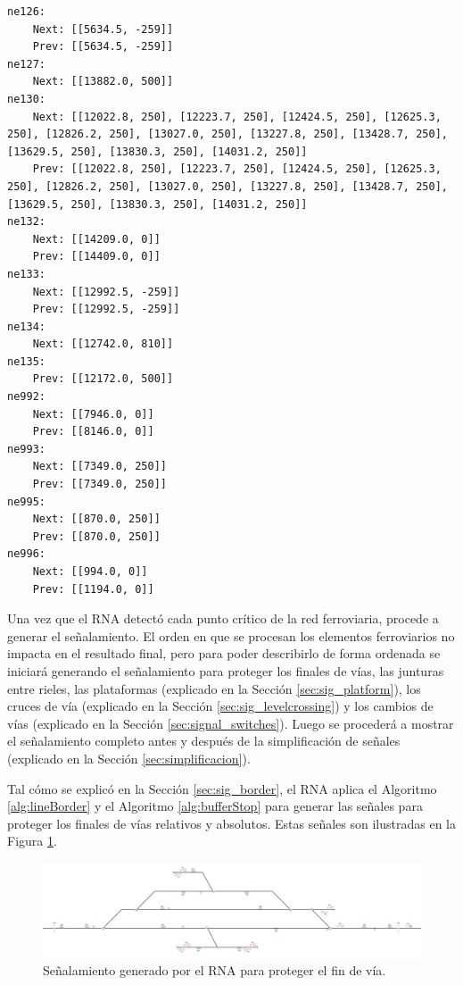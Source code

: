 \begin{lstlisting}[language = {}, tabsize=4, basicstyle=\footnotesize\ttfamily, showspaces=false, showstringspaces=false, caption = SafePoints.RNA, label = {lst:EJ4_5}]
ne126:
	Next: [[5634.5, -259]]
	Prev: [[5634.5, -259]]
ne127:
	Next: [[13882.0, 500]]
ne130:
	Next: [[12022.8, 250], [12223.7, 250], [12424.5, 250], [12625.3, 250], [12826.2, 250], [13027.0, 250], [13227.8, 250], [13428.7, 250], [13629.5, 250], [13830.3, 250], [14031.2, 250]]
	Prev: [[12022.8, 250], [12223.7, 250], [12424.5, 250], [12625.3, 250], [12826.2, 250], [13027.0, 250], [13227.8, 250], [13428.7, 250], [13629.5, 250], [13830.3, 250], [14031.2, 250]]
ne132:
	Next: [[14209.0, 0]]
	Prev: [[14409.0, 0]]
ne133:
	Next: [[12992.5, -259]]
	Prev: [[12992.5, -259]]
ne134:
	Next: [[12742.0, 810]]
ne135:
	Prev: [[12172.0, 500]]
ne992:
	Next: [[7946.0, 0]]
	Prev: [[8146.0, 0]]
ne993:
	Next: [[7349.0, 250]]
	Prev: [[7349.0, 250]]
ne995:
	Next: [[870.0, 250]]
	Prev: [[870.0, 250]]
ne996:
	Next: [[994.0, 0]]
	Prev: [[1194.0, 0]]
	\end{lstlisting}
	
	Una vez que el RNA detectó cada punto crítico de la red ferroviaria, procede a generar el señalamiento. El orden en que se procesan los elementos ferroviarios no impacta en el resultado final, pero para poder describirlo de forma ordenada se iniciará generando el señalamiento para proteger los finales de vías, las junturas entre rieles, las plataformas (explicado en la Sección \ref{sec:sig_platform}), los cruces de vía (explicado en la Sección \ref{sec:sig_levelcrossing}) y los cambios de vías (explicado en la Sección \ref{sec:signal_switches}). Luego se procederá a mostrar el señalamiento completo antes y después de la simplificación de señales (explicado en la Sección \ref{sec:simplificacion}). 
	
	Tal cómo se explicó en la Sección \ref{sec:sig_border}, el RNA aplica el Algoritmo \ref{alg:lineBorder} y el Algoritmo \ref{alg:bufferStop} para generar las señales para proteger los finales de vías relativos y absolutos. Estas señales son ilustradas en la Figura \ref{fig:EJ4_3}.
	
	\begin{figure}[H]
		\centering
		\includegraphics[width=1\textwidth]{resultados-obtenidos/ejemplo4/images/4_step1.png}
		\centering\caption{Señalamiento generado por el RNA para proteger el fin de vía.}
		\label{fig:EJ4_3}
	\end{figure}

